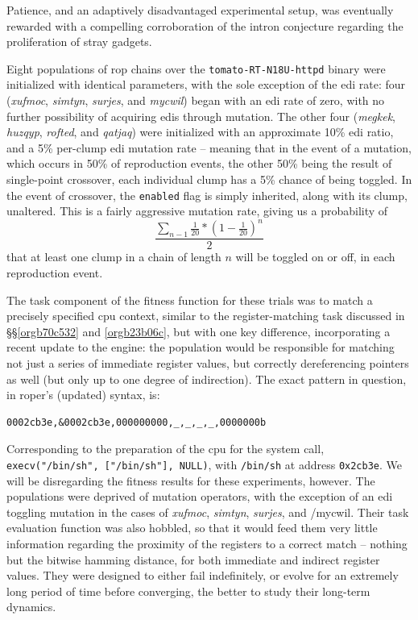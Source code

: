 \documentclass[12pt,glossary]{dalthesis}
\begin{document}
Patience, and an adaptively disadvantaged experimental setup, was eventually
rewarded with a compelling corroboration of the intron conjecture regarding
the proliferation of stray gadgets. 

Eight populations of \gls{rop} chains over the \texttt{tomato-RT-N18U-httpd} binary were
initialized with identical parameters, with the sole exception of the \gls{edi}
rate: four (\emph{xufmoc}, \emph{simtyn}, \emph{surjes}, and \emph{mycwil}) began with an \gls{edi}
rate of zero, with no further possibility of acquiring \glspl{edi} through
mutation. The other four (\emph{megkek}, \emph{huzqyp}, \emph{rofted}, and \emph{qatjaq}) were
initialized with an approximate 10\% \gls{edi} ratio, and a 5\% per-clump \gls{edi}
mutation rate -- meaning that in the event of a mutation, which occurs in 50\% of
reproduction events, the other 50\% being the result of single-point crossover,
each individual clump has a 5\% chance of being toggled. In the event of
crossover, the \texttt{enabled} flag is simply inherited, along with its clump,
unaltered. This is a fairly aggressive mutation rate, giving us a probability of
$$ \frac{\sum_{n-1} \frac{1}{20} * (1 - \frac{1}{20})^n}{2} $$ that at least one
clump in a chain of length \(n\) will be toggled on or off, in each reproduction
event.

The task component of the fitness function for these trials was to match a
precisely specified \gls{cpu} context, similar to the register-matching task
discussed in \S\S \ref{orgb70c532} and \ref{orgb23b06c}, but
with one key difference, incorporating a recent update to the engine: the
population would be responsible for matching not just a series of immediate
register values, but correctly dereferencing pointers as well (but only up to
one degree of indirection). The exact
pattern in question, in \gls{roper}'s (updated) syntax, is:
\begin{verbatim}
0002cb3e,&0002cb3e,000000000,_,_,_,_,0000000b
\end{verbatim}
Corresponding to the preparation of the \gls{cpu} for the system call,
\texttt{execv("/bin/sh", ["/bin/sh"], NULL)}, with \texttt{/bin/sh} at address
\texttt{0x2cb3e}. We will be disregarding the fitness results for these experiments,
however. The populations were deprived of mutation operators, with the exception
of an \gls{edi} toggling mutation in the cases of \emph{xufmoc}, \emph{simtyn}, \emph{surjes}, and
/mycwil. Their task evaluation function was also hobbled, so that it would feed
them very little information regarding the proximity of the registers to a correct match -- nothing but the bitwise hamming distance, for both immediate and indirect register
values. They were designed to either fail indefinitely, or evolve for an extremely
long period of time before converging, the better to study their long-term
dynamics. 
\end{document}
